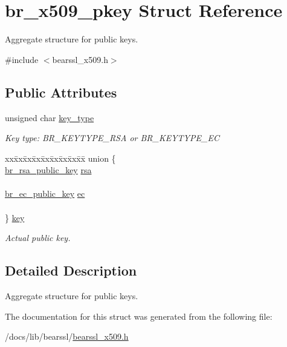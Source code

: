 \hypertarget{structbr__x509__pkey}{}\section{br\+\_\+x509\+\_\+pkey Struct Reference}
\label{structbr__x509__pkey}


Aggregate structure for public keys.  




{\ttfamily \#include $<$bearssl\+\_\+x509.\+h$>$}

\subsection*{Public Attributes}
\begin{DoxyCompactItemize}
\item 
\mbox{\label{structbr__x509__pkey_ae71f837af474a3a78e41a2be9c54001f}} 
unsigned char \hyperlink{structbr__x509__pkey_ae71f837af474a3a78e41a2be9c54001f}{key\+\_\+type}
\begin{DoxyCompactList}\small\item\em Key type\+: {\ttfamily B\+R\+\_\+\+K\+E\+Y\+T\+Y\+P\+E\+\_\+\+R\+SA} or {\ttfamily B\+R\+\_\+\+K\+E\+Y\+T\+Y\+P\+E\+\_\+\+EC} \end{DoxyCompactList}\item 
\mbox{\label{structbr__x509__pkey_a7bfc548716e7850cbefe5810ddc9441e}} 
\begin{tabbing}
xx\=xx\=xx\=xx\=xx\=xx\=xx\=xx\=xx\=\kill
union \{\\
\>\hyperlink{structbr__rsa__public__key}{br\_rsa\_public\_key} \hyperlink{structbr__x509__pkey_a7f7c843bd143d99567e9975cfddb4aba}{rsa}\\
\>\\
\>\hyperlink{structbr__ec__public__key}{br\_ec\_public\_key} \hyperlink{structbr__x509__pkey_a406633613711a0ccd38729a11c84e2a8}{ec}\\
\>\\
\} \hyperlink{structbr__x509__pkey_a7bfc548716e7850cbefe5810ddc9441e}{key}\\

\end{tabbing}\begin{DoxyCompactList}\small\item\em Actual public key. \end{DoxyCompactList}\end{DoxyCompactItemize}


\subsection{Detailed Description}
Aggregate structure for public keys. 

The documentation for this struct was generated from the following file\+:\begin{DoxyCompactItemize}
\item 
/docs/lib/bearssl/\hyperlink{bearssl__x509_8h}{bearssl\+\_\+x509.\+h}\end{DoxyCompactItemize}
